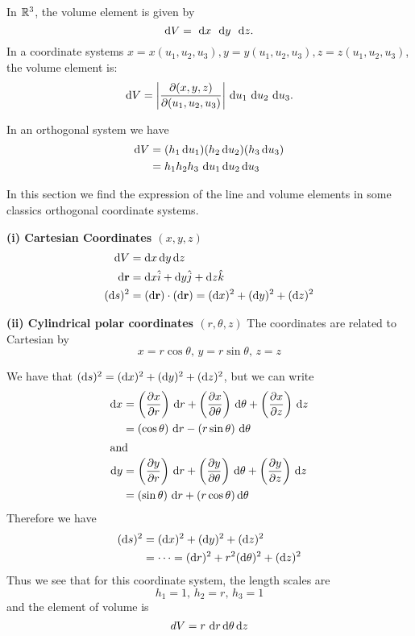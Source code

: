 \begin{definition}
In $\mathbb{R}^3$, the volume element is given by 
\[\d V = \dx\,\dy\,\dz.\]
In a coordinate systems
$x=x(u_1,u_2,u_3), y=y(u_1,u_2,u_3), z=z(u_1,u_2,u_3)$, the volume element  is:
\[\d V = \left|\dfrac{\partial (x,y,z)}{\partial (u_1,u_2,u_3)}\right|\,\d u_1\,\d u_2\,\d u_3.\]
\end{definition}


\begin{prop} In an orthogonal system we have
 \begin{align*}
  \d V &= (h_1\d u_1)(h_2 \d u_2)(h_3 \d u_3)\\
  &= h_1h_2h_3\,\d u_1\d u_2\d u_3
\end{align*}
\end{prop}





In this section we find the expression of the line and volume elements in some classics orthogonal coordinate systems.

 \textbf{(i) Cartesian Coordinates $(x,y,z)$}
\begin{align*}
  \d V &= \d x\d y \d z\\
   \d \mathbf r &= \d x\hat i + \d y \hat j + \d z \hat k\\
(\d s)^2  &= (\d\mathbf r)\cdot(\d \mathbf r) = (\d x)^2 + (\d y)^2 + (\d z)^2
\end{align*}


\textbf{(ii) Cylindrical polar coordinates $(r,\theta,z)$}
The coordinates are related to Cartesian by 
\[
  x = r\cos \theta,\, y = r\sin \theta,\, z = z
\]


We have that $(\d s)^2 = (\d x)^2 + (\d y)^2 + (\d z)^2$, but we can write 
\begin{align*}
  \d x &= \left(\dfrac{\partial x}{\partial r}\right)\,\d r + \left(\dfrac{\partial x}{\partial \theta}\right)\, \d \theta + \left(\dfrac{\partial x}{\partial z}\right)\,\d z\\
  &= (\cos \theta)\,\d r  - (r\sin \theta)\,\d \theta \\
  \intertext{and}
  \d y &= \left(\dfrac{\partial y}{\partial r}\right)\,\d r + \left(\dfrac{\partial y}{\partial \theta}\right)\, \d \theta + \left(\dfrac{\partial y}{\partial z}\right)\,\d z\\
  &= (\sin \theta)\,\d r + (r\cos\theta)\d \theta
\end{align*}
Therefore we have 
\begin{align*}
  (\d s)^2 &= (\d x)^2 + (\d y)^2 + (\d z)^2\\
  &= \dots = (\d r)^2 + r^2(\d\theta)^2 + (\d z)^2
\end{align*}
Thus we see that for this coordinate system, 
the length scales are 
\[
  h_1 = 1,\, h_2 = r,\, h_3 = 1
\]
and the element of volume is 
\[
  d V = r \,\d r\d \theta \d z
\]

